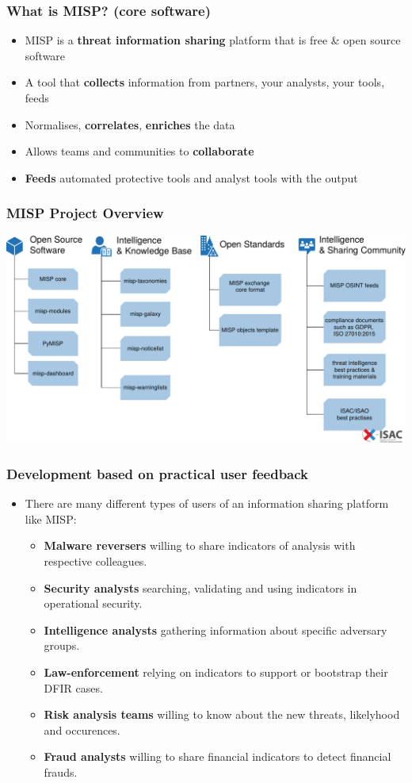 \begin{frame}
    \frametitle{What is MISP? (core software)}
\begin{itemize}
       \item MISP is a {\bf threat information sharing} platform that is free \& open source software
       \item A tool that {\bf collects} information from partners, your analysts, your tools, feeds
       \item Normalises, {\bf correlates}, {\bf enriches} the data
       \item Allows teams and communities to {\bf collaborate}
       \item {\bf Feeds} automated protective tools and analyst tools with the output
\end{itemize}
\end{frame}

\begin{frame}
        \frametitle{MISP Project Overview}
        \includegraphics[scale=0.35]{misp-overview-simplified.pdf}
\end{frame}

\begin{frame}
\frametitle{Development based on practical user feedback}
\begin{itemize}
\item There are many different types of users of an information sharing platform like MISP:
        \begin{itemize}
                \item {\bf Malware reversers} willing to share indicators of analysis with respective colleagues.
                \item {\bf Security analysts} searching, validating and using indicators in operational security.
                \item {\bf Intelligence analysts} gathering information about specific adversary groups.
                \item {\bf Law-enforcement} relying on indicators to support or bootstrap their DFIR cases.
                \item {\bf Risk analysis teams} willing to know about the new threats, likelyhood and occurences.
                \item {\bf Fraud analysts} willing to share financial indicators to detect financial frauds.
        \end{itemize}
\end{itemize}
\end{frame}

